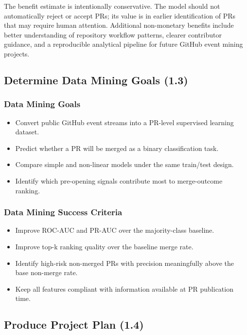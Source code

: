 The benefit estimate is intentionally conservative. The model should not automatically reject
or accept PRs; its value is in earlier identification of PRs that may require human attention.
Additional non-monetary benefits include better understanding of repository workflow patterns,
clearer contributor guidance, and a reproducible analytical pipeline for future GitHub event
mining projects.
\subsection{Determine Data Mining Goals (1.3)}

\subsubsection*{Data Mining Goals}

\begin{itemize}
    \item Convert public GitHub event streams into a PR-level supervised learning dataset.
    \item Predict whether a PR will be merged as a binary classification task.
    \item Compare simple and non-linear models under the same train/test design.
    \item Identify which pre-opening signals contribute most to merge-outcome ranking.
\end{itemize}

\subsubsection*{Data Mining Success Criteria}

\begin{itemize}
    \item Improve ROC-AUC and PR-AUC over the majority-class baseline.
    \item Improve top-k ranking quality over the baseline merge rate.
    \item Identify high-risk non-merged PRs with precision meaningfully above the base non-merge rate.
    \item Keep all features compliant with information available at PR publication time.
\end{itemize}

\subsection{Produce Project Plan (1.4)}

